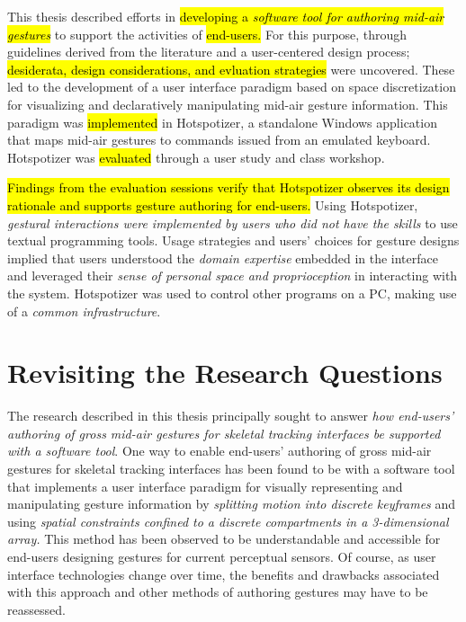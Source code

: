 This thesis described efforts in \hl{developing a \emph{software tool for authoring mid-air gestures}} to support the activities of \hl{end-users.} For this purpose, through guidelines derived from the literature and a user-centered design process; \hl{desiderata, design considerations, and evluation strategies} were uncovered. These led to the development of a user interface paradigm based on space discretization for visualizing and declaratively manipulating mid-air gesture information. This paradigm was \hl{implemented} in Hotspotizer, a standalone Windows application that maps mid-air gestures to commands issued from an emulated keyboard. Hotspotizer was \hl{evaluated} through a user study and class workshop.

\hl{Findings from the evaluation sessions verify that Hotspotizer observes its design rationale and supports gesture authoring for end-users.} Using Hotspotizer, \emph{gestural interactions were implemented by users who did not have the skills} to use textual programming tools. Usage strategies and users' choices for gesture designs implied that users understood the \emph{domain expertise} embedded in the interface and leveraged their \emph{sense of personal space and proprioception} in interacting with the system. Hotspotizer was used to control other programs on a PC, making use of a \emph{common infrastructure}.

\section{Revisiting the Research Questions}

The research described in this thesis principally sought to answer \emph{how end-users’ authoring of gross mid-air gestures for skeletal tracking interfaces be supported with a software tool}. One way to enable end-users' authoring of gross mid-air gestures for skeletal tracking interfaces has been found to be with a software tool that implements a user interface paradigm for visually representing and manipulating gesture information by \emph{splitting motion into discrete keyframes} and using \emph{spatial constraints confined to a discrete compartments in a 3-dimensional array.} This method has been observed to be understandable and accessible for end-users designing gestures for current perceptual sensors. Of course, as user interface technologies change over time, the benefits and drawbacks associated with this approach and other methods of authoring gestures may have to be reassessed.

